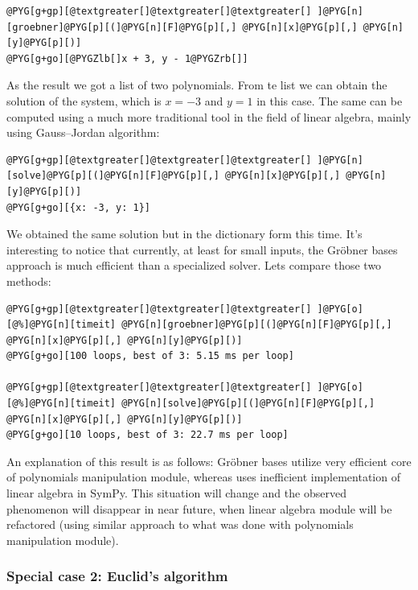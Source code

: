 \begin{Verbatim}[commandchars=@\[\]]
@PYG[g+gp][@textgreater[]@textgreater[]@textgreater[] ]@PYG[n][groebner]@PYG[p][(]@PYG[n][F]@PYG[p][,] @PYG[n][x]@PYG[p][,] @PYG[n][y]@PYG[p][)]
@PYG[g+go][@PYGZlb[]x + 3, y - 1@PYGZrb[]]
\end{Verbatim}
\noindent
As the result we got a list of two polynomials. From te list we can obtain the solution
of the system, which is $x = -3$ and $y = 1$ in this case. The same can be computed using
a much more traditional tool in the field of linear algebra, mainly using Gauss--Jordan
algorithm:

\begin{Verbatim}[commandchars=@\[\]]
@PYG[g+gp][@textgreater[]@textgreater[]@textgreater[] ]@PYG[n][solve]@PYG[p][(]@PYG[n][F]@PYG[p][,] @PYG[n][x]@PYG[p][,] @PYG[n][y]@PYG[p][)]
@PYG[g+go][{x: -3, y: 1}]
\end{Verbatim}
\noindent
We obtained the same solution but in the dictionary form this time. It's interesting to
notice that currently, at least for small inputs, the Gröbner bases approach is much
efficient than a specialized solver. Lets compare those two methods:

\begin{Verbatim}[commandchars=@\[\]]
@PYG[g+gp][@textgreater[]@textgreater[]@textgreater[] ]@PYG[o][@%]@PYG[n][timeit] @PYG[n][groebner]@PYG[p][(]@PYG[n][F]@PYG[p][,] @PYG[n][x]@PYG[p][,] @PYG[n][y]@PYG[p][)]
@PYG[g+go][100 loops, best of 3: 5.15 ms per loop]

@PYG[g+gp][@textgreater[]@textgreater[]@textgreater[] ]@PYG[o][@%]@PYG[n][timeit] @PYG[n][solve]@PYG[p][(]@PYG[n][F]@PYG[p][,] @PYG[n][x]@PYG[p][,] @PYG[n][y]@PYG[p][)]
@PYG[g+go][10 loops, best of 3: 22.7 ms per loop]
\end{Verbatim}
\noindent
An explanation of this result is as follows: Gröbner bases utilize very efficient core
of polynomials manipulation module, whereas  uses inefficient implementation
of linear algebra in SymPy. This situation will change and the observed phenomenon will
disappear in near future, when linear algebra module will be refactored (using similar
approach to what was done with polynomials manipulation module).
\hypertarget{thesis-euclid}{}

\subsubsection{Special case 2: Euclid's algorithm}

